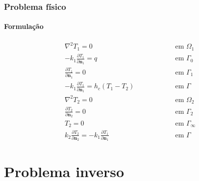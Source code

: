 \documentclass{beamer}
\begin{document}
\begin{frame}
	\frametitle{Problema físico}
	\framesubtitle{Formulação}
	\begin{subequations}
		\begin{alignat*}{2}
		& \nabla^2 T_1 = 0 \quad\quad\quad\quad && \text{ em } \Omega_1  \\ 
		& -k_1 \frac{\partial T_1}{\partial\mathbf{n}_1} = q && \text{ em } \Gamma_0   \\ 
		& \frac{\partial T_1}{\partial \mathbf{n}_1} = 0 && \text{ em }  \Gamma_1 \\ 
		& -k_1 \frac{\partial T_1}{\partial\mathbf{n}_1} = h_c(T_1-T_2) \quad\quad\quad\quad && \text{ em }  \Gamma \\ 
		& \nabla^2 T_2 = 0 && \text{ em }  \Omega_2\\ 
		& \frac{\partial T_2}{\partial \mathbf{n}_2} = 0 && \text{ em }  \Gamma_2 \\
		& T_2 = 0 && \text{ em }  \Gamma_\infty  \\ 
		& k_2\frac{\partial T_2}{\partial\mathbf{n}_2} = - k_1\frac{\partial T_1}{\partial\mathbf{n}_1} && \text{ em }  \Gamma 
		\end{alignat*}
	\end{subequations}
\end{frame}

\section{Problema inverso}
\end{document}

